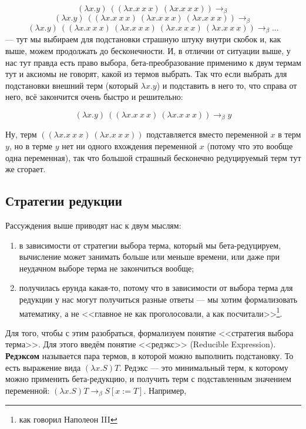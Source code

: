 \documentclass[a5paper]{article}
\begin{document}
$$(\lambda x.y)\ ((\lambda x.x\ x\ x)\ (\lambda x.x\ x\ x)) \rightarrow_\beta$$ 
$$(\lambda x.y)\ ((\lambda x.x\ x\ x)\ (\lambda x.x\ x\ x)\ (\lambda x.x\ x\ x)) \rightarrow_\beta$$
$$(\lambda x.y)\ ((\lambda x.x\ x\ x)\ (\lambda x.x\ x\ x)\ (\lambda x.x\ x\ x)\ (\lambda x.x\ x\ x)) \rightarrow_\beta ...$$
--- тут мы выбираем для подстановки страшную штуку внутри скобок и, как выше, можем продолжать до бесконечности. И, в отличии от ситуации выше, у нас тут правда есть право выбора, бета-преобразование применимо к двум термам тут и аксиомы не говорят, какой из термов выбрать. Так что если выбрать для подстановки внешний терм (который $\lambda x.y$) и подставить в него то, что справа от него, всё закончится очень быстро и решительно:

$$(\lambda x.y)\ ((\lambda x.x\ x\ x)\ (\lambda x.x\ x\ x)) \rightarrow_\beta y$$

Ну, терм $((\lambda x.x\ x\ x)\ (\lambda x.x\ x\ x))$ подставляется вместо переменной $x$ в терм $y$, но в терме $y$ нет ни одного вхождения переменной $x$ (потому что это вообще одна переменная), так что большой страшный бесконечно редуцируемый терм тут же сгорает.

\subsection{Стратегии редукции}

Рассуждения выше приводят нас к двум мыслям: 

\begin{enumerate}
    \item в зависимости от стратегии выбора терма, который мы бета-редуцируем, вычисление может занимать больше или меньше времени, или даже при неудачном выборе терма не закончиться вообще;
    \item получилась ерунда какая-то, потому что в зависимости от выбора терма для редукции у нас могут получиться разные ответы --- мы хотим формализовать математику, а не <<главное не как проголосовали, а как посчитали>>\footnote{как говорил Наполеон III}.
\end{enumerate}

Для того, чтобы с этим разобраться, формализуем понятие <<стратегия выбора терма>>. Для этого введём понятие <<редэкс>> (Reducible Expression). \textbf{Редэксом} называется пара термов, в которой можно выполнить подстановку. То есть выражение вида $(\lambda x.S) T$. Редэкс --- это минимальный терм, к которому можно применить бета-редукцию, и получить терм с подставленным значением переменной: $(\lambda x.S) T \rightarrow_\beta S[x := T]$. Например, 
\end{document}
